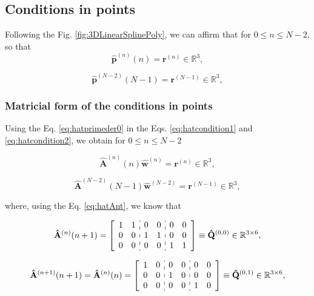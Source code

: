 \subsection{Conditions in points}

Following the Fig. \ref{fig:3DLinearSplinePoly}, 
we can affirm that for $0 \leq n\leq N-2$,
so that
\begin{equation}\label{eq:hatcondition1}
\mathbf{\hat{p}}^{(n)}(n)=\mathbf{r}^{(n)}
\in \mathbb{R}^{3},
\end{equation}

\begin{equation}\label{eq:hatcondition2}
\mathbf{\hat{p}}^{(N-2)}(N-1)=\mathbf{r}^{(N-1)}
\in \mathbb{R}^{3},
\end{equation}

\subsubsection{Matricial form of the conditions in points}
Using 
the Eq. \ref{eq:hatprimeder0} in 
the Eqs. \ref{eq:hatcondition1} and \ref{eq:hatcondition2},
we obtain for $0 \leq n\leq N-2$

\begin{equation}\label{eq:hatpointcond1}
\mathbf{\hat{A}}^{(n)}(n) \mathbf{\hat{w}}^{(n)}=\mathbf{r}^{(n)}
\in \mathbb{R}^{3},
\end{equation}

\begin{equation}\label{eq:hatpointcond2}
\mathbf{\hat{A}}^{(N-2)}(N-1) \mathbf{\hat{w}}^{(N-2)}=\mathbf{r}^{(N-1)}
\in \mathbb{R}^{3},
\end{equation}


where, using the Eq. \ref{eq:hatAnt}, we know that

\begin{equation}\label{eq:hatQ00}
\mathbf{\hat{A}}^{(n)}(n+1)=
\left[
\begin{array}{cc:cc:cc}
1 & 1 & 0 & 0 & 0 & 0 \\
0 & 0 & 1 & 1 & 0 & 0 \\
0 & 0 & 0 & 0 & 1 & 1 
\end{array}
\right]
\equiv \mathbf{\hat{Q}}^{(0,0)}\in \mathbb{R}^{3\times 6},
\end{equation}

\begin{equation}\label{eq:hatQ01}
\mathbf{\hat{A}}^{(n+1)}(n+1)
=
\mathbf{\hat{A}}^{(n)}(n)
=
\left[
\begin{array}{cc:cc:cc}
1 & 0 & 0 & 0 & 0 & 0 \\
0 & 0 & 1 & 0 & 0 & 0 \\
0 & 0 & 0 & 0 & 1 & 0 
\end{array}
\right]
\equiv \mathbf{\hat{Q}}^{(0,1)}\in \mathbb{R}^{3\times 6},
\end{equation}

